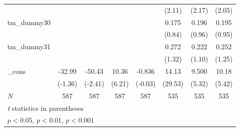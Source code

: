 {\begin{tabular}{l*{7}{c}}
            &                     &                     &                     &                     &      (2.11)         &      (2.17)         &      (2.05)         \\
[1em]
tm\_dummy30  &                     &                     &                     &                     &       0.175         &       0.196         &       0.195         \\
            &                     &                     &                     &                     &      (0.84)         &      (0.96)         &      (0.95)         \\
[1em]
tm\_dummy31  &                     &                     &                     &                     &       0.272         &       0.222         &       0.252         \\
            &                     &                     &                     &                     &      (1.32)         &      (1.10)         &      (1.25)         \\
[1em]
\_cons      &      -32.99         &      -50.43\sym{*}  &       10.36\sym{***}&      -0.836         &       14.13\sym{***}&       9.500\sym{***}&       10.18\sym{***}\\
            &     (-1.36)         &     (-2.41)         &      (6.21)         &     (-0.03)         &     (29.53)         &      (5.32)         &      (5.42)         \\
\hline
\(N\)       &         587         &         587         &         587         &         587         &         535         &         535         &         535         \\
\hline\hline
\multicolumn{8}{l}{\footnotesize \textit{t} statistics in parentheses}\\
\multicolumn{8}{l}{\footnotesize \sym{*} \(p<0.05\), \sym{**} \(p<0.01\), \sym{***} \(p<0.001\)}\\
\end{tabular}
}
